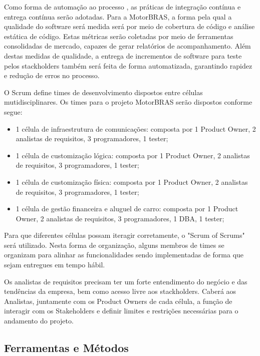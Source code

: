 \documentclass[12pt,journal,compsoc]{IEEEtran}
\begin{document}
Como forma de automação ao processo \cite{society_software_2004}, as práticas de integração contínua e entrega contínua serão adotadas. Para a MotorBRAS, a forma pela qual a qualidade do software será medida será por meio de cobertura de código e análise estática de código. Estas métricas serão coletadas por meio de ferramentas consolidadas de mercado, capazes de gerar relatórios de acompanhamento. Além destas medidas de qualidade, a entrega de incrementos de software para teste pelos stackholders também será feita de forma automatizada, garantindo rapidez e redução de erros no processo.   

O Scrum define times de desenvolvimento dispostos entre células mutidisciplinares. Os times para o projeto MotorBRAS serão dispostos conforme segue:

\begin{itemize}
\item 1 célula de infraestrutura de comunicações: composta por 1 Product Owner, 2 analistas de requisitos, 3 programadores, 1 tester; 
\item 1 célula de customização lógica: composta por 1 Product Owner, 2 analistas de requisitos, 3 programadores, 1 tester;
\item 1 célula de customização física: composta por 1 Product Owner, 2 analistas de requisitos, 3 programadores, 1 tester;
\item 1 célula de gestão financeira e aluguel de carro: composta por 1 Product Owner, 2 analistas de requisitos, 3 programadores, 1 DBA, 1 tester;
\end{itemize}

Para que diferentes células possam iteragir corretamente, o "Scrum of Scrums" será utilizado. Nesta forma de organização, alguns membros de times se organizam para alinhar as funcionalidades sendo implementadas de forma que sejam entregues em tempo hábil. \cite{backmann_nord_ozkaya_2012}

Os analistas de requisitos precisam ter um forte entendimento do negócio e das tendências da empresa, bem como acesso livre aos stackholders. Caberá aos Analistas, juntamente com os Product Owners de cada célula, a função de interagir com os Stakeholders e definir limites e restrições necessárias para o andamento do projeto.

\subsection{Ferramentas e Métodos}
\end{document}
